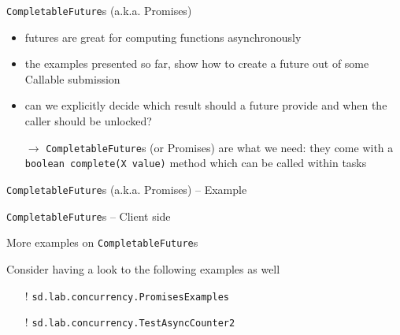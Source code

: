 \documentclass{beamer}\mode<presentation>{\usetheme{AMSBolognaFC}}
\begin{document}
\begin{frame}[c,allowframebreaks]{\texttt{CompletableFuture}s (a.k.a. Promises)}

	\begin{itemize}
		\item futures are great for computing functions \alert{asynchronously}

		\medskip

		\item the examples presented so far, show how to create a future out of some Callable submission

		\medskip

		\item can we explicitly decide which result should a future provide and when the caller should be unlocked?

		\bigskip

		\item[$\rightarrow$] \texttt{\alert{CompletableFuture}}s (or Promises) are what we need: they come with a \texttt{boolean complete(X value)} method which can be called within tasks
	\end{itemize}

	\framebreak

	

\end{frame}

\begin{frame}[c]{\texttt{CompletableFuture}s (a.k.a. Promises) -- Example}

	

\end{frame}

\begin{frame}[c]{\texttt{CompletableFuture}s -- Client side}

	

\end{frame}

\begin{frame}[c]{More examples on \texttt{CompletableFuture}s}

	Consider having a look to the following examples as well
	\begin{itemize}
		\item[!] \texttt{sd.lab.concurrency.\alert{PromisesExamples}}
		\item[!] \texttt{sd.lab.concurrency.\alert{TestAsyncCounter2}}
	\end{itemize}

\end{frame}
\end{document}
